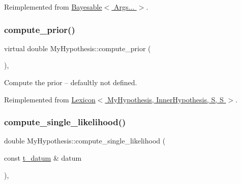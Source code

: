 Reimplemented from \hyperlink{class_bayesable_af9547335ae15a5068b10d29aee5056ae}{Bayesable$<$ Args... $>$}.

\mbox{\label{class_my_hypothesis_a67752bb4ba61994ef0cb64f7f9031f7f}} 
\subsubsection{\texorpdfstring{compute\+\_\+prior()}{compute\_prior()}}
{\footnotesize\ttfamily virtual double My\+Hypothesis\+::compute\+\_\+prior (\begin{DoxyParamCaption}{ }\end{DoxyParamCaption})\hspace{0.3cm}{\ttfamily [inline]}, {\ttfamily [virtual]}}



Compute the prior -- defaultly not defined. 



Reimplemented from \hyperlink{class_lexicon_a1ac27e460a361cc90566b92365909324}{Lexicon$<$ My\+Hypothesis, Inner\+Hypothesis, S, S $>$}.

\mbox{\label{class_my_hypothesis_a5e6bd5e0ebcb987aa4f0adf4295dba11}} 
\subsubsection{\texorpdfstring{compute\+\_\+single\+\_\+likelihood()}{compute\_single\_likelihood()}\hspace{0.1cm}{\footnotesize\ttfamily [1/2]}}
{\footnotesize\ttfamily double My\+Hypothesis\+::compute\+\_\+single\+\_\+likelihood (\begin{DoxyParamCaption}\item[{const \hyperlink{class_bayesable_a7c93a2eeab708378eb321745908718d4}{t\+\_\+datum} \&}]{datum }\end{DoxyParamCaption})\hspace{0.3cm}{\ttfamily [inline]}, {\ttfamily [virtual]}}



